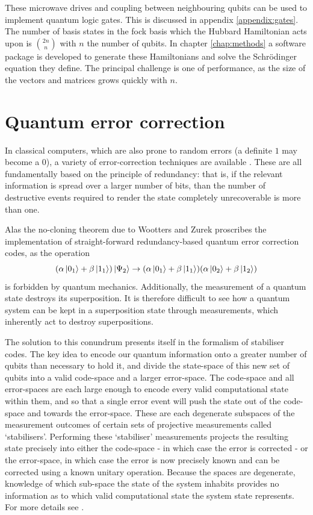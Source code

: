 \documentclass{report}
\begin{document}
These microwave drives and coupling between neighbouring qubits can be used to implement quantum logic gates. This is discussed in appendix \ref{appendix:gates}.
The number of basis states in the fock basis which the Hubbard Hamiltonian acts upon is $\binom{2n}{n}$ with $n$ the number of qubits. In chapter \ref{chap:methods} a software package is developed to generate these Hamiltonians and solve the Schrödinger equation they define. The principal challenge is one of performance, as the size of the vectors and matrices grows quickly with $n$.

\section{Quantum error correction}
In classical computers, which are also prone to random errors (a definite $1$ may become a $0$), a variety of error-correction techniques are available \cite{moon_2005}. These are all fundamentally based on the principle of redundancy: that is, if the relevant information is spread over a larger number of bits, than the number of destructive events required to render the state completely unrecoverable is more than one. 

Alas the no-cloning theorem due to Wootters and Zurek\cite{wootters_1982} proscribes the implementation of straight-forward redundancy-based quantum error correction codes, as the operation
\begin{equation*}
    (\alpha\ket{0_1} + \beta\ket{1_1})\ket{\Psi_2} \rightarrow (\alpha\ket{0_1} + \beta\ket{1_1})(\alpha\ket{0_2} + \beta\ket{1_2})
\end{equation*} is forbidden by quantum mechanics. Additionally, the measurement of a quantum state destroys its superposition. It is therefore difficult to see how a quantum system can be kept in a superposition state through measurements, which inherently act to destroy superpositions.

The solution to this conundrum presents itself in the formalism of stabiliser codes. The key idea to encode our quantum information onto a greater number of qubits than necessary to hold it, and divide the state-space of this new set of qubits into a valid code-space and a larger error-space. The code-space and all error-spaces are each large enough to encode every valid computational state within them, and so that a single error event will push the state out of the code-space and towards the error-space. These are each degenerate subspaces of the measurement outcomes of certain sets of projective measurements called `stabilisers'. Performing these `stabiliser' measurements projects the resulting state precisely into either the code-space - in which case the error is corrected - or the error-space, in which case the error is now precisely known and can be corrected using a known unitary operation. Because the spaces are degenerate, knowledge of which sub-space the state of the system inhabits provides no information as to which valid computational state the system state represents. For more details see \cite{roffe_2019}.
\end{document}
